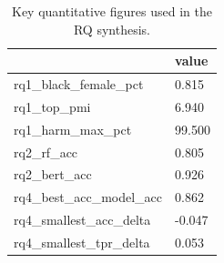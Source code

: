 \begin{table}[htbp]
\centering
\caption{Key quantitative figures used in the RQ synthesis.}
\label{tab:rq-key-numbers_selfcheck}
\begin{tabular}{ll}
\toprule
 & value \\
\midrule
rq1\_black\_female\_pct & 0.815 \\
rq1\_top\_pmi & 6.940 \\
rq1\_harm\_max\_pct & 99.500 \\
rq2\_rf\_acc & 0.805 \\
rq2\_bert\_acc & 0.926 \\
rq4\_best\_acc\_model\_acc & 0.862 \\
rq4\_smallest\_acc\_delta & -0.047 \\
rq4\_smallest\_tpr\_delta & 0.053 \\
\bottomrule
\end{tabular}

\end{table}